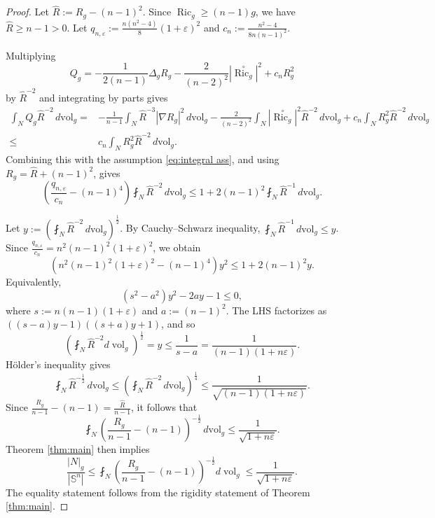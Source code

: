 \documentclass[11pt, reqno]{amsart}
\begin{document}
\begin{proof}
Let $\widehat R:=R_g-(n-1)^2$. Since $\operatorname{Ric}_g\ge (n-1)g$, we have $\widehat R\ge n-1>0$. Let
$q_{n, \varepsilon}:=\frac{n(n^2-4)}{8}(1+\varepsilon)^2$ and
$c_n:=\frac{n^2-4}{8n(n-1)^2}$.

Multiplying
$$Q_g=-\frac{1}{2(n-1)}\Delta_gR_g-\frac{2}{(n-2)^2}|\stackrel {\circ}{\operatorname{Ric}_g}|^2+c_nR_g^2$$
by $\widehat R^{-2}$ and integrating by parts gives
\begin{align*}
\int_NQ_g\widehat R^{-2}\, d\mathrm{vol}_g
=& -\frac{1}{n-1}\int_N\widehat R^{-3}|\nabla R_g|^2\, d\mathrm{vol}_g-\frac{2}{(n-2)^2}\int_N|\stackrel {\circ}{\operatorname{Ric}_g}|^2\widehat R^{-2}\, d\mathrm{vol}_g+c_n\int_NR_g^2\widehat R^{-2}\, d\mathrm{vol}_g\\
\le& c_n\int_NR_g^2\widehat R^{-2}\, d\mathrm{vol}_g.
\end{align*}
Combining this with the assumption \eqref{eq:integral ass}, and using $R_g=\widehat R+(n-1)^2$, gives
$$\left(\frac{q_{n, \varepsilon}}{c_n}-(n-1)^4\right)\fint_N\widehat R^{-2}\, d\mathrm{vol}_g\le 1+2(n-1)^2\fint_N\widehat R^{-1}\, d\mathrm{vol}_g. $$

Let $y:=\left(\fint_N\widehat R^{-2}\, d\mathrm{vol}_g\right)^{\frac{1}{2}}$. By Cauchy--Schwarz inequality, $\fint_N\widehat R^{-1}\, d\mathrm{vol}_g\le y$. Since $\frac{q_{n, \varepsilon}}{c_n}=n^2(n-1)^2(1+\varepsilon)^2$, we obtain
$$\left(n^2(n-1)^2(1+\varepsilon)^2-(n-1)^4\right)y^2\le 1+2(n-1)^2y. $$
Equivalently,
$$\left(s^2-a^2\right) y^2-2 a y-1\le0, $$
where $s:=n(n-1)(1+\varepsilon)$ and $a:=(n-1)^2$. The LHS factorizes as $((s-a) y-1)((s+a) y+1)$, and so
$$\left(\fint_N \widehat{R}^{-2} d \operatorname{vol}_g\right)^{\frac{1}{2}}=y\le \frac{1}{s-a}=\frac{1}{(n-1)(1+n\varepsilon)}. $$
Hölder's inequality gives
$$\fint_N\widehat R^{-\frac12}\, d\mathrm{vol}_g\le \left(\fint_N\widehat R^{-2}\, d\mathrm{vol}_g\right)^{\frac14}\le \frac{1}{\sqrt{(n-1)(1+n\varepsilon)}}. $$
Since $\frac{R_g}{n-1}-(n-1)=\frac{\widehat R}{n-1}$, it follows that
$$\fint_N\left(\frac{R_g}{n-1}-(n-1)\right)^{-\frac12}\, d\mathrm{vol}_g\le \frac{1}{\sqrt{1+n\varepsilon}}. $$
Theorem \ref{thm:main} then implies
$$\frac{|N|_g}{|\mathbb S^n|}
\le \fint_N\left(\frac{R_g}{n-1}-(n-1)\right)^{-\frac{1}{2}} d \operatorname{vol}_g
\le \frac{1}{\sqrt{1+n\varepsilon}}. $$
The equality statement follows from the rigidity statement of Theorem \ref{thm:main}.
\end{proof}
\end{document}
